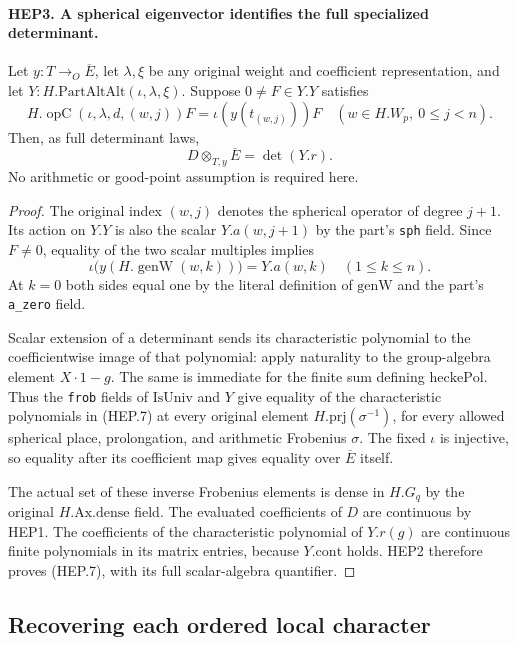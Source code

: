 \documentclass[11pt,a4paper]{article}
\numberwithin{equation}{section}
\theoremstyle{remark}\newtheorem{remark}[theorem]{Remark}
\begin{document}
\paragraph{HEP3. A spherical eigenvector identifies the full specialized determinant.}
\label{claim:HEP3}
Let $y:T\to_O\overline E$, let $\lambda,\xi$ be any original
weight and coefficient representation, and let
$Y:H.\mathrm{PartAltAlt}(\iota,\lambda,\xi)$.
Suppose $0\ne F\in Y.Y$ satisfies
\[
 H.\operatorname{opC}(\iota,\lambda,d,(w,j))F
       =\iota(y(t_{(w,j)}))F
       \quad(w\in H.W_p,\ 0\leq j<n).
 \tag{HEP.6}
\]
Then, as full determinant laws,
\[
                    D\otimes_{T,y}\overline E
                             =\det(Y.r).
 \tag{HEP.7}
\]
No arithmetic or good-point assumption is required here.
\begin{proof}
The original index $(w,j)$ denotes the spherical operator of
degree $j+1$.  Its action on $Y.Y$ is also the scalar
$Y.a(w,j+1)$ by the part's \texttt{sph} field.
Since $F\ne0$, equality of the two scalar multiples implies
\[
       \iota\bigl(y(H.\operatorname{genW}(w,k))\bigr)=Y.a(w,k)
                                      \quad(1\leq k\leq n).
\]
At $k=0$ both sides equal one by the literal definition of
$\mathrm{genW}$ and the part's \texttt{a\_\allowbreak zero} field.

Scalar extension of a determinant sends its characteristic
polynomial to the coefficientwise image of that polynomial:
apply naturality to the group-algebra element $X\cdot1-g$.
The same is immediate for the finite sum defining
$\mathrm{heckePol}$.  Thus the \texttt{frob} fields of
$\mathrm{IsUniv}$ and $Y$ give equality of the characteristic
polynomials in (HEP.7) at every original element
$H.\mathrm{prj}(\sigma^{-1})$, for every allowed spherical place,
prolongation, and arithmetic Frobenius $\sigma$.
The fixed $\iota$ is injective, so equality after its coefficient
map gives equality over $\overline E$ itself.

The actual set of these inverse Frobenius elements is dense in
$H.G_q$ by the original $H.\mathrm{Ax.dense}$ field.
The evaluated coefficients of $D$ are continuous by HEP1.
The coefficients of the characteristic polynomial of $Y.r(g)$
are continuous finite polynomials in its matrix entries, because
$Y.\mathrm{cont}$ holds.  HEP2 therefore proves (HEP.7), with
its full scalar-algebra quantifier.
\end{proof}

\subsection{Recovering each ordered local character}
\end{document}
